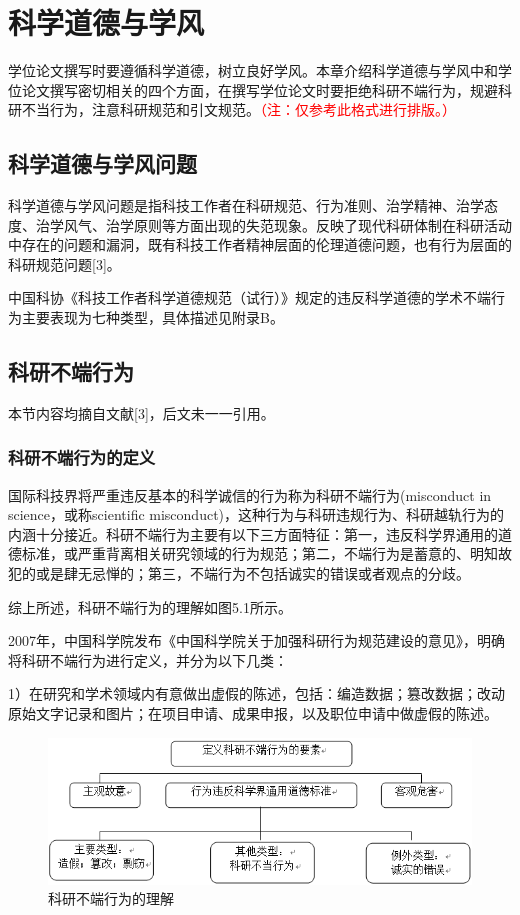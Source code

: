 \chapter{科学道德与学风}

学位论文撰写时要遵循科学道德，树立良好学风。本章介绍科学道德与学风中和学位论文撰写密切相关的四个方面，在撰写学位论文时要拒绝科研不端行为，规避科研不当行为，注意科研规范和引文规范。\textcolor{red}{（注：仅参考此格式进行排版。）}

\section{科学道德与学风问题}

科学道德与学风问题是指科技工作者在科研规范、行为准则、治学精神、治学态度、治学风气、治学原则等方面出现的失范现象。反映了现代科研体制在科研活动中存在的问题和漏洞，既有科技工作者精神层面的伦理道德问题，也有行为层面的科研规范问题[3]。

中国科协《科技工作者科学道德规范（试行）》规定的违反科学道德的学术不端行为主要表现为七种类型，具体描述见附录B。

\section{科研不端行为}

本节内容均摘自文献[3]，后文未一一引用。

\subsection{科研不端行为的定义}

国际科技界将严重违反基本的科学诚信的行为称为科研不端行为(misconduct in science，或称scientific misconduct)，这种行为与科研违规行为、科研越轨行为的内涵十分接近。科研不端行为主要有以下三方面特征：第一，违反科学界通用的道德标准，或严重背离相关研究领域的行为规范；第二，不端行为是蓄意的、明知故犯的或是肆无忌惮的；第三，不端行为不包括诚实的错误或者观点的分歧。

综上所述，科研不端行为的理解如图5.1所示。

2007年，中国科学院发布《中国科学院关于加强科研行为规范建设的意见》，明确将科研不端行为进行定义，并分为以下几类：

1）在研究和学术领域内有意做出虚假的陈述，包括：编造数据；篡改数据；改动原始文字记录和图片；在项目申请、成果申报，以及职位申请中做虚假的陈述。

\begin{figure}[htbp]
	\centering
	\includegraphics[width=12cm]{images/chapters/5.1}
	\caption{科研不端行为的理解} 
	\label{fig:5.1} 
\end{figure}

